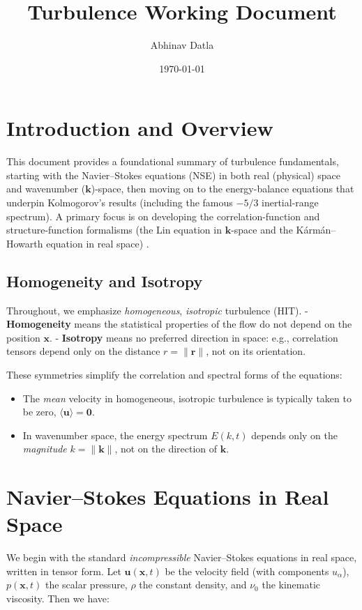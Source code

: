\documentclass[12pt,a4paper]{article}
\title{\textbf{Turbulence Working Document}}
\author{Abhinav Datla}
\date{\today}
\newcommand\ub{\mathbf{u}}   %
\newcommand\pb{p}           %
\newcommand\x{\mathbf{x}}    %
\newcommand\kvec{\mathbf{k}} %
\begin{document}
\maketitle

\section{Introduction and Overview}

This document provides a foundational summary of turbulence fundamentals, starting with the Navier--Stokes equations (NSE) in both real (physical) space and wavenumber (\(\kvec\))-space, then moving on to the energy-balance equations that underpin Kolmogorov’s results (including the famous \(-5/3\) inertial-range spectrum).  A primary focus is on developing the correlation-function and structure-function formalisms (the Lin equation in \(\kvec\)-space and the Kármán–Howarth equation in real space) \cite{McComb14a}. 

\subsection{Homogeneity and Isotropy}

Throughout, we emphasize \emph{homogeneous}, \emph{isotropic} turbulence (HIT).  
- \textbf{Homogeneity} means the statistical properties of the flow do not depend on the position \(\x\).  
- \textbf{Isotropy} means no preferred direction in space: e.g., correlation tensors depend only on the distance \(r = \|\mathbf{r}\|\), not on its orientation.

These symmetries simplify the correlation and spectral forms of the equations:
\begin{itemize}
\item The \emph{mean} velocity in homogeneous, isotropic turbulence is typically taken to be zero, \(\langle \ub \rangle = \mathbf{0}\).  
\item In wave\-number space, the energy spectrum \(E(k,t)\) depends only on the \emph{magnitude} \(k = \|\kvec\|\), not on the direction of \(\kvec\).
\end{itemize}

\section{Navier--Stokes Equations in Real Space}
We begin with the standard \emph{incompressible} Navier--Stokes equations in real space, written in tensor form.  Let \(\ub(\x,t)\) be the velocity field (with components \(u_\alpha\)), \(\pb(\x,t)\) the scalar pressure, \(\rho\) the constant density, and \(\nu_0\) the kinematic viscosity.  Then we have:
\end{document}
